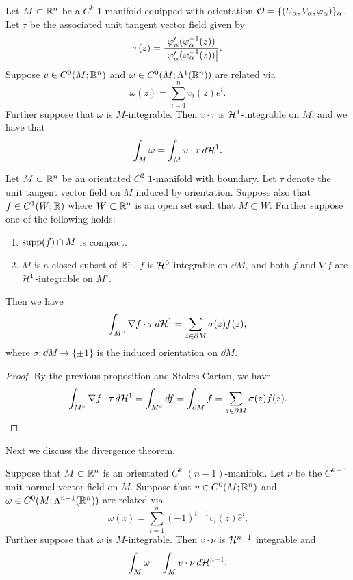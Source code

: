 \documentclass[a4paper]{article}
\begin{document}
\begin{prop}
Let $M \subset \mathbb{R}^n$ be a $C^k$ $1$-manifold equipped with 
orientation $\mathcal{O} = \{(U_\alpha, V_\alpha, \varphi_\alpha)\}_\alpha$.
Let $\tau$ be the associated unit tangent vector field given by 
\[
\tau(z) = \frac{\varphi_\alpha'(\varphi_\alpha^{-1}(z))}
{\left\lvert \varphi_\alpha'(\varphi_\alpha^{-1}(z))\right\rvert}.
\] 
Suppose $v \in C^0(M; \mathbb{R}^n)$ and $\omega \in C^0 (M; \Lambda^1 
(\mathbb{R}^n))$ are related via 
\[
\omega(z) = \sum_{i=1}^n v_i(z) e^i.
\]
Further suppose that $\omega$ is $M$-integrable. 
Then $v \cdot \tau$ is $\mathcal{H}^1$-integrable on $M$, 
and we have that 
\[
\int_M \omega = \int_M v \cdot \tau \, d \mathcal{H}^1.
\]
\end{prop}

\begin{thm}
Let $M \subset \mathbb{R}^n$ be an orientated $C^2$ $1$-manifold
with boundary. Let $\tau$ denote the unit tangent
vector field on $M$ induced by orientation. Suppose also 
that $f \in C^1 (W; \mathbb{R})$ where $W \subset \mathbb{R}^n$ is an open set 
such that $M \subset W$. Further suppose one of the following 
holds: 
\begin{enumerate}
\item $\operatorname{supp}(f) \cap M$ is compact.
\item $M$ is a closed subset of $\mathbb{R}^n$, $f$ is $\mathcal{H}^0$-integrable
on $\dd M$, and both $f$ and $\nabla f$ are $\mathcal{H}^1$-integrable
on $M^\circ$.
\end{enumerate}
Then we have 
\[
\int_{M^\circ} \nabla f \cdot \tau \, d \mathcal{H}^1 
= \sum_{z \in \partial M} \sigma(z) f(z),
\]
where $\sigma : \dd M \to \{\pm 1\}$ is the induced
orientation on $\dd M$.
\end{thm}

\begin{proof}
By the previous proposition and Stokes-Cartan, we have 
\[
\int_{M^\circ} \nabla f \cdot \tau \, d \mathcal{H}^1 
= \int_{M^\circ} d f
= \int_{\partial M} f
= \sum_{z \in \partial M} \sigma(z) f(z).
\]
\end{proof}

Next we discuss the divergence theorem. 

\begin{prop}
Suppose that $M \subset \mathbb{R}^n$ is an orientated $C^k$
$(n-1)$-manifold. Let $\nu$ be the $C^{k-1}$ unit normal 
vector field on $M$. Suppose that $v \in C^0(M ; \mathbb{R}^n)$ and 
$\omega \in C^0(M; \Lambda^{n-1}(\mathbb{R}^n))$ are related via 
\[
\omega(z) = \sum_{i=1}^n (-1)^{i-1} v_i(z) \hat{e}^i.
\]
Further suppose that $\omega$ is $M$-integrable. Then 
$v \cdot \nu$ is $\mathcal{H}^{n-1}$ integrable and 
\[
\int_M \omega = \int_M v \cdot \nu \, d \mathcal{H}^{n-1}.
\]
\end{prop}
\end{document}
